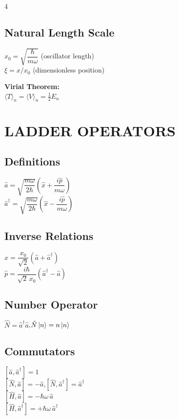 \documentclass[10pt,landscape,a4paper]{article}
\newcommand{\aop}{\hat{a}}
\newcommand{\adop}{\hat{a}^{\dagger}}
\newcommand{\Nop}{\hat{N}}
\newcommand{\Hop}{\hat{H}}
\newcommand{\xop}{\hat{x}}
\newcommand{\pop}{\hat{p}}
\newcommand{\xzero}{x_0}
\begin{document}
\begin{multicols}{4}
\subsection{Natural Length Scale}
$\xzero = \sqrt{\dfrac{\hbar}{m\omega}}$ (oscillator length)\\[2pt]
$\xi = x/\xzero$ (dimensionless position)

\vspace{3pt}
\begin{notebox}
\textbf{Virial Theorem:}\\
$\langle T\rangle_n = \langle V\rangle_n = \tfrac{1}{2}E_n$
\end{notebox}

\section{LADDER OPERATORS}

\subsection{Definitions}
\begin{keybox}
$\aop = \sqrt{\dfrac{m\omega}{2\hbar}}\!\left(\xop + \dfrac{i\pop}{m\omega}\right)$\\[4pt]
$\adop = \sqrt{\dfrac{m\omega}{2\hbar}}\!\left(\xop - \dfrac{i\pop}{m\omega}\right)$
\end{keybox}

\subsection{Inverse Relations}
$\xop = \dfrac{\xzero}{\sqrt{2}}(\aop+\adop)$\\[4pt]
$\pop = \dfrac{i\hbar}{\sqrt{2}\,\xzero}(\adop-\aop)$

\subsection{Number Operator}
$\Nop = \adop\aop$,\quad $\Nop\ket{n} = n\ket{n}$

\subsection{Commutators}
\begin{keybox}
$[\aop,\adop] = 1$\\[2pt]
$[\Nop,\aop] = -\aop$,\quad $[\Nop,\adop] = \adop$\\[2pt]
$[\Hop,\aop] = -\hbar\omega\,\aop$\\[2pt]
$[\Hop,\adop] = +\hbar\omega\,\adop$
\end{keybox}


\end{multicols}
\end{document}
